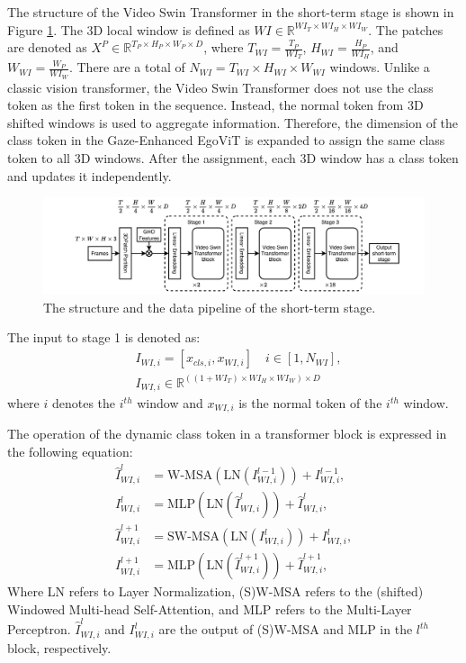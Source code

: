 The structure of the Video Swin Transformer in the short-term stage is shown in Figure \ref{fig:video_swin_transformer}. The 3D local window is defined as $WI \in \mathbb{R}^{WI_T \times WI_H \times WI_W}$. The patches are denoted as $X^P \in \mathbb{R}^{T_P \times H_P \times W_P \times D}$, where $T_{WI} = \frac{T_P}{WI_T}$, $H_{WI} = \frac{H_P}{WI_H}$, and $W_{WI} = \frac{W_P}{WI_W}$. There are a total of $N_{WI} = T_{WI} \times H_{WI} \times W_{WI}$ windows. Unlike a classic vision transformer, the Video Swin Transformer does not use the class token as the first token in the sequence. Instead, the normal token from 3D shifted windows is used to aggregate information. Therefore, the dimension of the class token in the Gaze-Enhanced EgoViT is expanded to assign the same class token to all 3D windows. After the assignment, each 3D window has a class token and updates it independently.
\begin{figure}
    \centering
    \includegraphics[width=\textwidth]{graphics/vst_st.pdf}
    \caption{The structure and the data pipeline of the short-term stage.}
    \label{fig:video_swin_transformer}
\end{figure}

The input to stage 1 is denoted as:
\begin{equation}
    \begin{aligned}
    &I_{WI,i} = [x_{cls,i}, x_{WI,i}] \quad i \in [1, N_{WI}], \\[12pt]
    &I_{WI,i} \in \mathbb{R}^{((1 + WI_T) \times WI_H \times WI_W) \times D}
    \end{aligned}
\end{equation}
where $i$ denotes the $i^{th}$ window and $x_{WI,i}$ is the normal token of the $i^{th}$ window.

The operation of the dynamic class token in a transformer block is expressed in the following equation:
\begin{equation}
    \begin{aligned}
        \hat{I}_{WI,i}^l &= \text{W-MSA}(\text{LN}(I_{WI,i}^{l-1})) + I_{WI,i}^{l-1}, \\[10pt]
        I_{WI,i}^l &= \text{MLP}(\text{LN}(\hat{I}_{WI,i}^l)) + \hat{I}_{WI,i}^l, \\[10pt]
        \hat{I}_{WI,i}^{l+1} &= \text{SW-MSA}(\text{LN}(I_{WI,i}^l)) + I_{WI,i}^l, \\[10pt]
        I_{WI,i}^{l+1} &= \text{MLP}(\text{LN}(\hat{I}_{WI,i}^{l+1})) + \hat{I}_{WI,i}^{l+1},
    \end{aligned}
\end{equation}
Where LN refers to Layer Normalization, (S)W-MSA refers to the (shifted) Windowed Multi-head Self-Attention, and MLP refers to the Multi-Layer Perceptron. $\hat{I}_{WI,i}^{l}$ and $I_{WI,i}^l$ are the output of (S)W-MSA and MLP in the $l^{th}$ block, respectively. 

